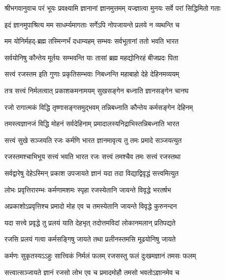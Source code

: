 {श्रीभगवानुवाच}
\twolineshloka
{परं भूयः प्रवक्ष्यामि ज्ञानानां ज्ञानमुत्तमम्}
{यज्ज्ञात्वा मुनयः सर्वे परां सिद्धिमितो गताः}%

\twolineshloka
{इदं ज्ञानमुपाश्रित्य मम साधर्म्यमागताः}
{सर्गेऽपि नोपजायन्ते प्रलये न व्यथन्ति च}%

\twolineshloka
{मम योनिर्महद्-ब्रह्म तस्मिन्गर्भं दधाम्यहम्}
{सम्भवः सर्वभूतानां ततो भवति भारत}%

\twolineshloka
{सर्वयोनिषु कौन्तेय मूर्तयः सम्भवन्ति याः}
{तासां ब्रह्म महद्योनिरहं बीजप्रदः पिता}%

\twolineshloka
{सत्त्वं रजस्तम इति गुणाः प्रकृतिसम्भवाः}
{निबध्नन्ति महाबाहो देहे देहिनमव्ययम्}%

\twolineshloka
{तत्र सत्त्वं निर्मलत्वात् प्रकाशकमनामयम्}
{सुखसङ्गेन बध्नाति ज्ञानसङ्गेन चानघ}%

\twolineshloka
{रजो रागात्मकं विद्धि तृष्णासङ्गसमुद्भवम्}
{तन्निबध्नाति कौन्तेय कर्मसङ्गेन देहिनम्}%

\twolineshloka
{तमस्त्वज्ञानजं विद्धि मोहनं सर्वदेहिनाम्}
{प्रमादालस्यनिद्राभिस्तन्निबध्नाति भारत}%

\twolineshloka
{सत्त्वं सुखे सञ्जयति रजः कर्मणि भारत}
{ज्ञानमावृत्य तु तमः प्रमादे सञ्जयत्युत}%

\twolineshloka
{रजस्तमश्चाभिभूय सत्त्वं भवति भारत}
{रजः सत्त्वं तमश्चैव तमः सत्त्वं रजस्तथा}%

\twolineshloka
{सर्वद्वारेषु देहेऽस्मिन् प्रकाश उपजायते}
{ज्ञानं यदा तदा विद्याद्विवृद्धं सत्त्वमित्युत}%

\twolineshloka
{लोभः प्रवृत्तिरारम्भः कर्मणामशमः स्पृहा}
{रजस्येतानि जायन्ते विवृद्धे भरतर्षभ}%

\twolineshloka
{अप्रकाशोऽप्रवृत्तिश्च प्रमादो मोह एव च}
{तमस्येतानि जायन्ते विवृद्धे कुरुनन्दन}%

\twolineshloka
{यदा सत्त्वे प्रवृद्धे तु प्रलयं याति देहभृत्}
{तदोत्तमविदां लोकानमलान् प्रतिपद्यते}%

\twolineshloka
{रजसि प्रलयं गत्वा कर्मसङ्गिषु जायते}
{तथा प्रलीनस्तमसि मूढयोनिषु जायते}%

\twolineshloka
{कर्मणः सुकृतस्यऽऽहुः सात्त्विकं निर्मलं फलम्}
{रजसस्तु फलं दुःखमज्ञानं तमसः फलम्}%

\twolineshloka
{सत्त्वात्सञ्जायते ज्ञानं रजसो लोभ एव च}
{प्रमादमोहौ तमसो भवतोऽज्ञानमेव च}%

